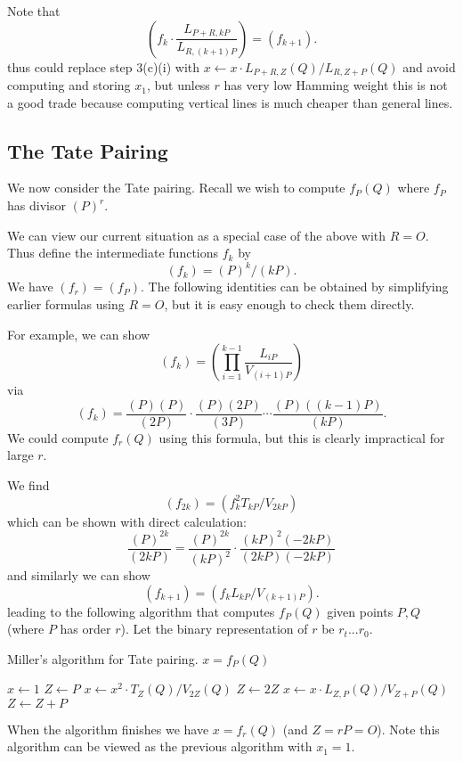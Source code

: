 Note that
\[
\left(
f_k \cdot \frac{L_{P+R,kP}}{L_{R,(k+1)P}}
\right) = (f_{k+1}) .
\]
thus could replace step 3(c)(i) with
$x \gets x \cdot L_{P+R, Z}(Q) / L_{R,Z+P}(Q)$
and avoid computing and storing $x_1$, but unless
$r$ has very low Hamming weight this is not a good trade
because computing vertical lines is much cheaper than general lines.

\subsection {The Tate Pairing}

We now consider the Tate pairing. Recall we wish to compute
$f_P(Q)$ where $f_P$ has divisor $(P)^r$.

We can view our current situation as a special case of the above
with $R = O$.
Thus define the intermediate functions $f_k$ by
\[ (f_k) = (P)^k / (kP) . \]
We have $(f_r) = (f_P)$.
The following identities can be obtained by simplifying
earlier formulas using $R=O$, but it is easy enough to check them directly.

For example, we can show
\[ (f_k) = \left(\prod_{i=1}^{k-1} \frac{L_{iP}}{V_{(i+1)P}}\right) \]
via
\[ (f_k) =
\frac{(P)(P)}{(2P)}
\cdot
\frac{(P)(2P)}{(3P)}
\cdots
\frac{(P)((k-1)P)}{(kP)} .
\]
We could compute $f_r(Q)$ using this formula,
but this is clearly impractical for large $r$.

We find
\[
(f_{2k}) = (f_k^2 T_{kP} / V_{2kP} )
\]
which can be shown with direct calculation:
\[
\frac{(P)^{2k}}{(2kP)} =
\frac{(P)^{2k}}{(kP)^2} \cdot
\frac{(kP)^2 (-2kP)}{(2kP)(-2kP)}
\]
and similarly we can show
\[
(f_{k+1}) = (f_k L_{kP} / V_{(k+1)P}).
\]
leading to the following algorithm that
computes $f_P(Q)$ given points $P,Q$ (where $P$ has order $r$).
Let the binary representation of $r$ be $r_t ... r_0$.

\begin{algorithm}
\caption{Miller's algorithm for Tate pairing. $x = f_P(Q)$}
\begin{algorithmic}[1]
\STATE $x \gets 1$
\STATE $Z \gets P$
    \STATE $x \gets x^2 \cdot T_Z(Q) / V_{2Z}(Q)$
    \STATE $Z \gets 2Z$
	\STATE $x \gets x \cdot L_{Z,P}(Q) / V_{Z+P}(Q)$
	\STATE $Z \gets Z + P$
    \ENDIF
\ENDFOR
\end{algorithmic}
\end{algorithm}

When the algorithm finishes we have $x = f_r(Q)$ (and $Z = rP = O$).
Note this algorithm can be viewed as the previous algorithm with $x_1 = 1$.

